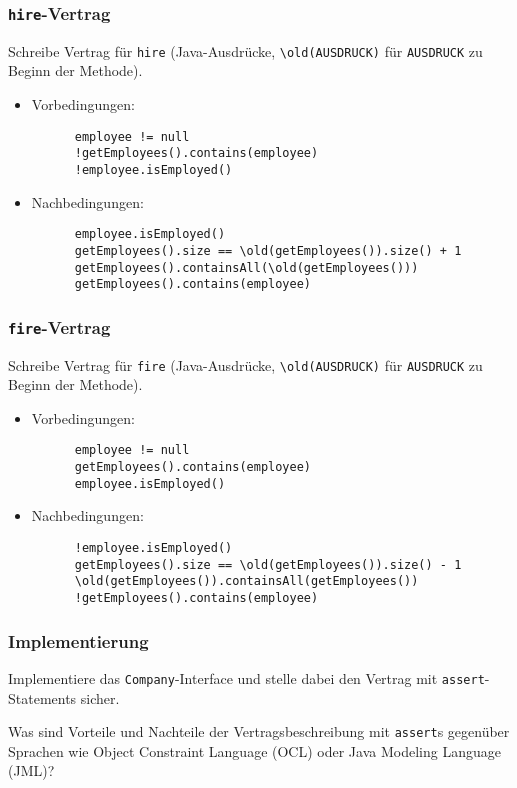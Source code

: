 \documentclass{beamer}
\begin{document}
\begin{frame}[fragile]
  \frametitle{\lstinline{hire}-Vertrag}
  Schreibe Vertrag für \lstinline{hire}
  (Java-Ausdrücke, \lstinline{\old(AUSDRUCK)} für \lstinline{AUSDRUCK} zu Beginn der Methode).
  \begin{itemize}
  \item Vorbedingungen:\pause
    \begin{lstlisting}
      employee != null
      !getEmployees().contains(employee)
      !employee.isEmployed()
    \end{lstlisting}
  \item Nachbedingungen:\pause
    \begin{lstlisting}
      employee.isEmployed()
      getEmployees().size == \old(getEmployees()).size() + 1
      getEmployees().containsAll(\old(getEmployees()))
      getEmployees().contains(employee)
    \end{lstlisting}
  \end{itemize}
\end{frame}

\begin{frame}[fragile]
  \frametitle{\lstinline{fire}-Vertrag}
  Schreibe Vertrag für \lstinline{fire}
  (Java-Ausdrücke, \lstinline{\old(AUSDRUCK)} für \lstinline{AUSDRUCK} zu Beginn der Methode).
  \begin{itemize}
  \item Vorbedingungen:\pause
    \begin{lstlisting}
      employee != null
      getEmployees().contains(employee)
      employee.isEmployed()
    \end{lstlisting}
  \item Nachbedingungen:\pause
    \begin{lstlisting}
      !employee.isEmployed()
      getEmployees().size == \old(getEmployees()).size() - 1
      \old(getEmployees()).containsAll(getEmployees())
      !getEmployees().contains(employee)
    \end{lstlisting}
  \end{itemize}
\end{frame}

\begin{frame}
  \frametitle{Implementierung}
  Implementiere das \lstinline{Company}-Interface
  und stelle dabei den Vertrag mit \lstinline{assert}-Statements sicher.
  
  Was sind Vorteile und Nachteile der Vertragsbeschreibung mit \lstinline{assert}s
  gegenüber Sprachen wie Object Constraint Language (OCL) oder Java Modeling Language (JML)?
\end{frame}
\end{document}
